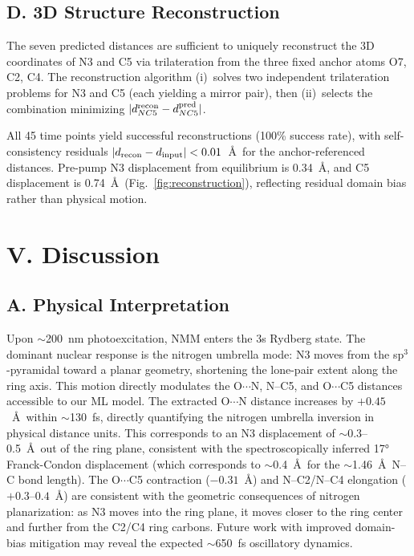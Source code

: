 \documentclass[12pt]{article}
\begin{document}
\subsection*{D.\; 3D Structure Reconstruction}

The seven predicted distances are sufficient to uniquely reconstruct
the 3D coordinates of N3 and C5 via trilateration from the three
fixed anchor atoms O7, C2, C4. The reconstruction algorithm
(i)~solves two independent trilateration problems for N3 and C5
(each yielding a mirror pair), then (ii)~selects the combination
minimizing $|d_{NC5}^{\rm recon} - d_{NC5}^{\rm pred}|$.

All 45 time points yield successful reconstructions (100\% success
rate), with self-consistency residuals
$|d_{\rm recon} - d_{\rm input}| < 0.01$~\AA\ for the
anchor-referenced distances. Pre-pump N3 displacement from
equilibrium is 0.34~\AA, and C5 displacement is 0.74~\AA\
(Fig.~\ref{fig:reconstruction}), reflecting residual domain bias
rather than physical motion.

\section*{V.\; Discussion}

\subsection*{A.\; Physical Interpretation}

Upon $\sim$200~nm photoexcitation, NMM enters the 3s Rydberg
state.\cite{Zhang2017,Beedle2017} The dominant nuclear response is the
nitrogen umbrella mode: N3 moves from the sp$^3$-pyramidal toward a
planar geometry, shortening the lone-pair extent along the ring axis.
This motion directly modulates the O$\cdots$N, N--C5, and O$\cdots$C5
distances accessible to our ML model. The extracted O$\cdots$N distance increases by $+0.45$~\AA\
within $\sim$130~fs, directly quantifying the nitrogen umbrella
inversion in physical distance units. This corresponds to an
N3 displacement of $\sim$0.3--0.5~\AA\ out of the ring plane,
consistent with the spectroscopically inferred 17° Franck-Condon
displacement\cite{Zhang2017} (which corresponds to $\sim$0.4~\AA\
for the $\sim$1.46~\AA\ N--C bond length). The O$\cdots$C5
contraction ($-0.31$~\AA) and N--C2/N--C4 elongation
($+0.3$--$0.4$~\AA) are consistent with the geometric consequences
of nitrogen planarization: as N3 moves into the ring plane, it
moves closer to the ring center and further from the C2/C4 ring
carbons. Future work with improved domain-bias mitigation may
reveal the expected $\sim$650~fs oscillatory dynamics.
\end{document}
